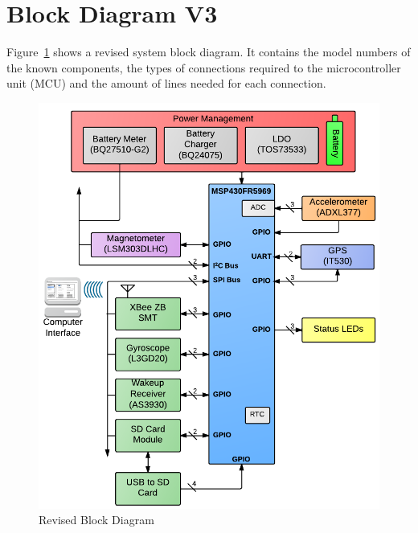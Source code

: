 \section{Block Diagram V3}

Figure~\ref{fig:blockDiagram} shows a revised system block diagram.  It contains the model numbers of the known components, the types of connections required to the microcontroller unit (MCU) and the amount of lines needed for each connection.

\begin{figure}[H]
	\centering
	\includegraphics[width=\textwidth]{img/blockDiagramV3}
	\caption{Revised Block Diagram \label{fig:blockDiagram}}
\end{figure}
